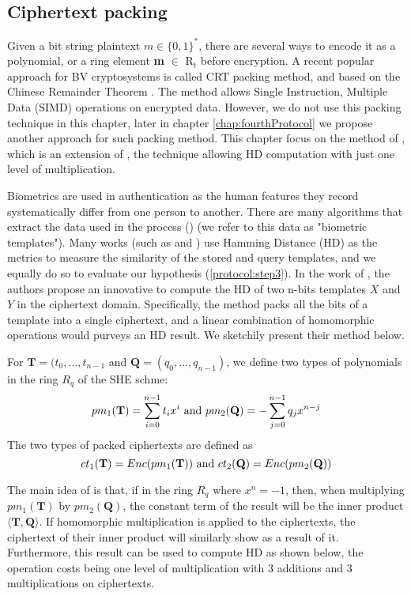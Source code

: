 \subsection{Ciphertext packing}
\label{sub:ciphertext_packing}
Given a bit string plaintext $m \in \{0,1\}^*$, there are several ways to encode
it as a polynomial, or a ring element \textbf{m} $\in$ R$_{t}$ before
encryption. A recent popular approach for BV cryptosystems is called CRT packing
method, and based on the Chinese Remainder Theorem \cite{smart2014fully}. The
method allows Single Instruction, Multiple Data (SIMD) operations on encrypted
data. However, we do not use this packing technique in this chapter, later in
chapter \ref{chap:fourthProtocol} we propose another approach for such packing
method. This chapter focus on the method of \cite{yasuda2014practical}, which is
an extension of \cite{naehrig2011can}, the technique allowing HD computation
with just one level of multiplication.

Biometrics are used in authentication as the human features they record
systematically differ from one person to another. There are many algorithms that
extract the data used in the process (\cite{FVConGoi2:online}) (we refer to this
data as "biometric templates"). Many works (such as \cite{daugman2003importance}
and \cite{FujitsuD7:online}) use Hamming Distance (HD) as the metrics to measure
the similarity of the stored and query templates, and we equally do so to
evaluate our hypothesis (\ref{protocol:step3}). In the work of
\cite{yasuda2014practical}, the authors propose an innovative to compute the HD
of two n-bits templates $X$ and $Y$ in the ciphertext domain. Specifically, the
method packs all the bits of a template into a single ciphertext, and a linear
combination of homomorphic operations would purveys an HD result. We sketchily
present their method below.
\begin{definition}
  For $\mathbf{T} = (t_0, \dots, t_{n-1}$ and
  $\mathbf{Q} = (q_0, \dots, q_{n-1})$, we define two types of polynomials in
  the ring $R_q$ of the SHE schme:
  \[
    pm_1(\mathbf{T}) = \sum_{i=0}^{n-1}t_ix^i \ \textnormal{and} \
    pm_2(\mathbf{Q}) = - \sum_{j=0}^{n-1}q_jx^{n-j}
  \]
  The two types of packed ciphertexts are defined as
  \[
    ct_{1}(\mathbf{T}) = Enc(pm_1(\mathbf{T})) \ \textnormal{and} \
    ct_{2}(\mathbf{Q}) = Enc(pm_2(\mathbf{Q}))
  \]
\end{definition}
The main idea of \cite{yasuda2014practical} is that, if in the ring $R_q$ where
$x^n = -1$, then, when multiplying $pm_1(\mathbf{T})$ by $pm_2(\mathbf{Q})$, the
constant term of the result will be the inner product
$\langle \mathbf{T}, \mathbf{Q}\rangle$. If homomorphic multiplication is
applied to the ciphertexts, the ciphertext of their inner product will similarly
show as a result of it. Furthermore, this result can be used to compute HD as
shown below, the operation costs being one level of multiplication with 3
additions and 3 multiplications on ciphertexts.

